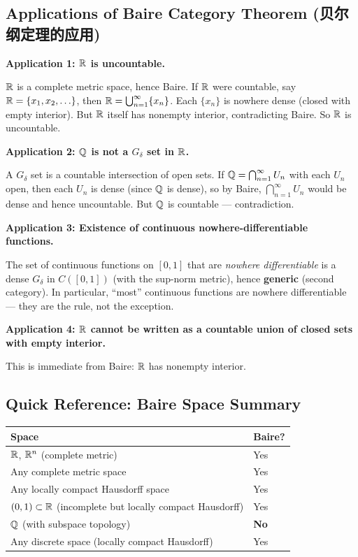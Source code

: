 \documentclass{article}
\begin{document}
\subsection{Applications of Baire Category Theorem
(贝尔纲定理的应用)}\label{def:baire-applications}

\textbf{Application 1: $\mathbb{R}$ is uncountable.}

$\mathbb{R}$ is a complete metric space, hence Baire. If $\mathbb{R}$ were countable,
say $\mathbb{R} = \{x_1, x_2, \ldots\}$, then $\mathbb{R} = \bigcup_{n=1}^\infty \{x_n\}$.
Each $\{x_n\}$ is nowhere dense (closed with empty interior).
But $\mathbb{R}$ itself has nonempty interior, contradicting Baire.
So $\mathbb{R}$ is uncountable.

\textbf{Application 2: $\mathbb{Q}$ is not a $G_\delta$ set in $\mathbb{R}$.}

A $G_\delta$ set is a countable intersection of open sets.
If $\mathbb{Q} = \bigcap_{n=1}^\infty U_n$ with each $U_n$ open,
then each $U_n$ is dense (since $\mathbb{Q}$ is dense), so by Baire,
$\bigcap_{n=1}^\infty U_n$ would be dense and hence uncountable.
But $\mathbb{Q}$ is countable --- contradiction.

\textbf{Application 3: Existence of continuous nowhere-differentiable
functions.}

The set of continuous functions on $[0,1]$ that are \emph{nowhere
differentiable}
is a dense $G_\delta$ in $C([0,1])$ (with the sup-norm metric), hence
\textbf{generic} (second category). In particular, ``most'' continuous
functions are nowhere differentiable --- they are the rule, not the exception.

\textbf{Application 4: $\mathbb{R}$ cannot be written as a countable union of
closed sets with empty interior.}

This is immediate from Baire: $\mathbb{R}$ has nonempty interior.

\subsection{Quick Reference: Baire Space Summary}\label{def:baire-summary}

\begin{center}
  \begin{tabular}{ll}
    \textbf{Space} & \textbf{Baire?} \\
    \hline
    $\mathbb{R}$, $\mathbb{R}^n$ (complete metric) & Yes \\
    Any complete metric space & Yes \\
    Any locally compact Hausdorff space & Yes \\
    $(0, 1) \subset \mathbb{R}$ (incomplete but locally compact Hausdorff) & Yes \\
    $\mathbb{Q}$ (with subspace topology) & \textbf{No} \\
    Any discrete space (locally compact Hausdorff) & Yes \\
  \end{tabular}
\end{center}
\end{document}
